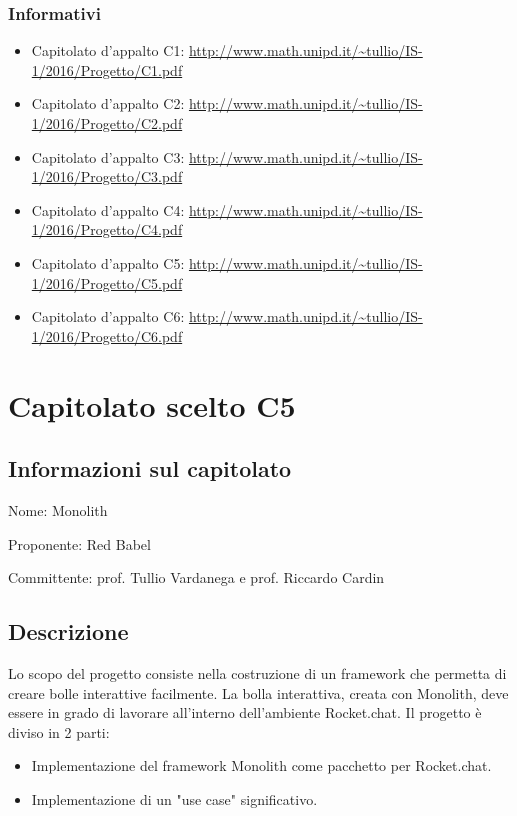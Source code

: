 \subsubsection{Informativi}
\begin{itemize}

\item Capitolato d’appalto C1: \url{http://www.math.unipd.it/~tullio/IS-1/2016/Progetto/C1.pdf}
\item Capitolato d’appalto C2: \url{http://www.math.unipd.it/~tullio/IS-1/2016/Progetto/C2.pdf}
\item Capitolato d’appalto C3:
\url{http://www.math.unipd.it/~tullio/IS-1/2016/Progetto/C3.pdf }
\item Capitolato d’appalto C4: 
\url{http://www.math.unipd.it/~tullio/IS-1/2016/Progetto/C4.pdf}
\item Capitolato d’appalto C5: 
\url{http://www.math.unipd.it/~tullio/IS-1/2016/Progetto/C5.pdf}
\item Capitolato d’appalto C6:
\url{http://www.math.unipd.it/~tullio/IS-1/2016/Progetto/C6.pdf}
 
\end{itemize}

\section{Capitolato scelto C5}

\subsection{Informazioni sul capitolato}
\begin{trivlist}
	\setlength{\itemindent}{+.3in}
	\item  Nome: Monolith
	\item  Proponente: Red Babel
	\item  Committente: prof. Tullio Vardanega e prof. Riccardo Cardin
\end{trivlist}
	
\subsection{Descrizione}
Lo scopo del progetto consiste nella costruzione di un framework che permetta di creare bolle interattive facilmente. La bolla interattiva, creata con Monolith, deve essere in grado di lavorare all'interno dell'ambiente Rocket.chat.
Il progetto è diviso in 2 parti:
\begin{itemize}
	\item Implementazione del framework Monolith come pacchetto per Rocket.chat. 
	\item Implementazione di un "use case" significativo.
\end{itemize}



